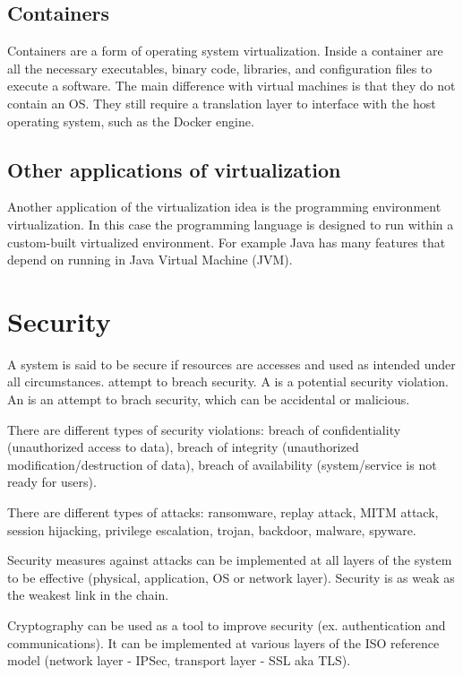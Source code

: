 \subsection{Containers}
Containers are a form of operating system virtualization. Inside a container are all the necessary executables, binary code, libraries, and configuration files to execute a software. The main difference with virtual machines is that they do not contain an OS. They still require a translation layer to interface with the host operating system, such as the Docker engine.

\subsection{Other applications of virtualization}
Another application of the virtualization idea is the programming environment virtualization. In this case the programming language is designed to run within a custom-built virtualized environment. For example Java has many features that depend on running in Java Virtual Machine (JVM).

\section{Security}
A system is said to be secure if resources are accesses and used as intended under all circumstances.  attempt to breach security. A  is a potential security violation. An  is an attempt to brach security, which can be accidental or malicious.

There are different types of security violations: breach of confidentiality (unauthorized access to data), breach of integrity (unauthorized modification/destruction of data), breach of availability (system/service is not ready for users).

There are different types of attacks: ransomware, replay attack, MITM attack, session hijacking, privilege escalation, trojan, backdoor, malware, spyware.

Security measures against attacks can be implemented at all layers of the system to be effective (physical, application, OS or network layer). Security is as weak as the weakest link in the chain.

Cryptography can be used as a tool to improve security (ex. authentication and communications). It can be implemented at various layers of the ISO reference model (network layer - IPSec, transport layer - SSL aka TLS).

